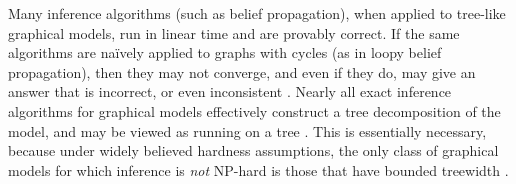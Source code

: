 \documentclass{article}
\begin{document}
Many inference algorithms (such as belief propagation),
when applied to tree-like graphical models,
run in linear time and are provably correct.
If the same algorithms are na{\"i}vely applied to graphs with cycles (as in loopy belief propagation),
then they may not converge, and even if they do,
may give an answer that is incorrect, or even inconsistent \parencite{wainwright2008graphical}.
Nearly all exact inference algorithms for graphical models
effectively construct a tree decomposition of the model, and may be viewed as running on a tree \parencite[\S9-11]{koller2009probabilistic}.
This is essentially necessary, because under widely believed hardness assumptions,
 the only class of {\color{red}graphical models} for which inference is \emph{not} NP-hard is those that have bounded treewidth \parencite{chandrasekaran2012complexity}.
\end{document}
